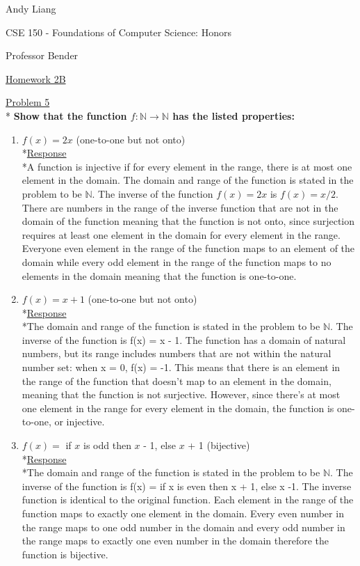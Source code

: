 \documentclass[12pt]{article}
\begin{document}
\begin{flushleft}
Andy Liang

CSE 150 - Foundations of Computer Science: Honors

Professor Bender
\end{flushleft}
\medskip
\centerline{\uline{Homework 2B}}

\noindent
\uline{Problem 5}
\\*\textbf{ Show that the function $f: \mathbb{N} \rightarrow \mathbb{N}$ has the listed properties:}
\begin{enumerate}
\item $f(x) = 2x$ \qquad (one-to-one but not onto)
\smallskip
\\*\uline{Response}
\\*A function is injective if for every element in the range, there is at most one element in the domain. The domain and range of the function is stated in the problem to be $\mathbb{N}$. The inverse of the function $f(x) = 2x$ is $f(x) = x/2$. There are numbers in the range of the inverse function that are not in the domain of the function meaning that the function is not onto, since surjection requires at least one element in the domain for every element in the range. Everyone even element in the range of the function maps to an element of the domain while every odd element in the range of the function maps to no elements in the domain meaning that the function is one-to-one. 
\item $f(x) = x + 1$ \qquad (one-to-one but not onto)
\smallskip
\\*\uline{Response}
\\*The domain and range of the function is stated in the problem to be $\mathbb{N}$. The inverse of the function is f(x) = x - 1. The function has a domain of natural numbers, but its range includes numbers that are not within the natural number set: when x = 0, f(x) = -1. This means that there is an element in the range of the function that doesn't map to an element in the domain, meaning that the function is not surjective. However, since there's at most one element in the range for every element in the domain, the function is one-to-one, or injective. 
\item $f(x) =$ if $x$ is odd then $x$ - 1, else $x$ + 1 \qquad (bijective)
\smallskip
\\*\uline{Response}
\\*The domain and range of the function is stated in the problem to be $\mathbb{N}$. The inverse of the function is f(x) = if x is even then x + 1, else x -1. The inverse function is identical to the original function. Each element in the range of the function maps to exactly one element in the domain. Every even number in the range maps to one odd number in the domain and every odd number in the range maps to exactly one even number in the domain therefore the function is bijective.
\end{enumerate}
\end{document}
